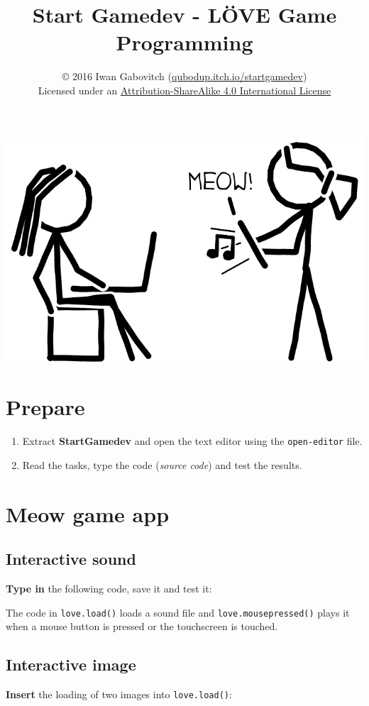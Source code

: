 \documentclass[a4paper, 11pt]{article}
\date{\vspace{-5ex}}
\title{\vspace{-8ex}Start Gamedev - LÖVE Game Programming\vspace{-1ex}}
\author{\copyright{} 2016 Iwan Gabovitch (\href{http://qubodup.itch.io/startgamedev}{qubodup.itch.io/startgamedev})\\
Licensed under an \href{http://creativecommons.org/licenses/by-sa/4.0/}{Attribution-ShareAlike 4.0 International License}}
\begin{document}
\maketitle
\thispagestyle{fancy}

\begin{center}
  \includegraphics[width=.4\textwidth]{graphics/done.png}
\end{center}

\section{Prepare}

\begin{enumerate}
  \item Extract \textbf{StartGamedev} and open the text editor using the \texttt{open-editor} file.
  \item Read the tasks, type the code (\textit{source code}) and test the results.
\end{enumerate}

\section{Meow game app}

\subsection{Interactive sound}

\textbf{Type in} the following code, save it and test it:



The code in \texttt{love.load()} loads a sound file and \texttt{love.mousepressed()} plays it when a mouse button is pressed or the touchscreen is touched.

\subsection{Interactive image}

\textbf{Insert} the loading of two images into \texttt{love.load()}:
\end{document}
